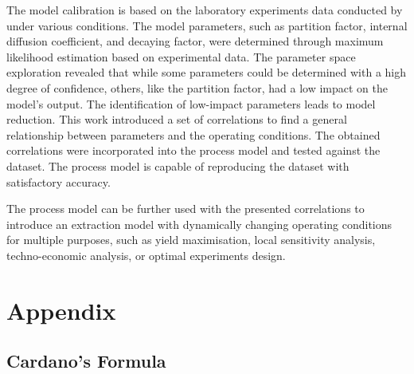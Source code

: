 \documentclass[a4paper,fleqn]{cas-dc}
\begin{document}
The model calibration is based on the laboratory experiments data conducted by \citet{Povh2001} under various conditions. The model parameters, such as partition factor, internal diffusion coefficient, and decaying factor, were determined through maximum likelihood estimation based on experimental data. The parameter space exploration revealed that while some parameters could be determined with a high degree of confidence, others, like the partition factor, had a low impact on the model's output. The identification of low-impact parameters leads to model reduction. This work introduced a set of correlations to find a general relationship between parameters and the operating conditions. The obtained correlations were incorporated into the process model and tested against the dataset. The process model is capable of reproducing the dataset with satisfactory accuracy.

The process model can be further used with the presented correlations to introduce an extraction model with dynamically changing operating conditions for multiple purposes, such as yield maximisation, local sensitivity analysis, techno-economic analysis, or optimal experiments design.

\newpage
%



\clearpage \appendix \label{appendix}
\section{Appendix} 

 \label{CH: EOS}

\subsection{Cardano's Formula} \label{CH: Cardano}

\end{document}

